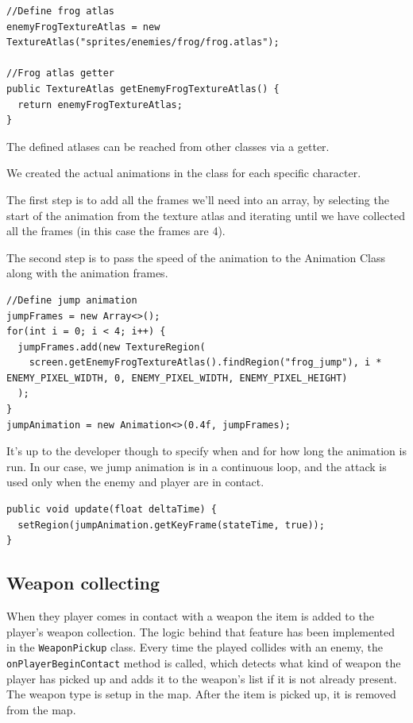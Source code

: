 \documentclass[12p]{article}
\begin{document}
\begin{verbatim}
//Define frog atlas
enemyFrogTextureAtlas = new TextureAtlas("sprites/enemies/frog/frog.atlas");

//Frog atlas getter
public TextureAtlas getEnemyFrogTextureAtlas() {
  return enemyFrogTextureAtlas;
}
\end{verbatim}

The defined atlases can be reached from other classes via a getter.

We created the actual animations in the class for each specific character. 

The first step is to add all the frames we'll need into an array, by selecting the start of the animation from the texture atlas and iterating until we have collected all the frames (in this case the frames are 4).

The second step is to pass the speed of the animation to the Animation Class along with the animation frames.

\begin{verbatim}
//Define jump animation
jumpFrames = new Array<>();
for(int i = 0; i < 4; i++) {
  jumpFrames.add(new TextureRegion(
    screen.getEnemyFrogTextureAtlas().findRegion("frog_jump"), i * ENEMY_PIXEL_WIDTH, 0, ENEMY_PIXEL_WIDTH, ENEMY_PIXEL_HEIGHT)
  );
}
jumpAnimation = new Animation<>(0.4f, jumpFrames);
\end{verbatim}

It's up to the developer though to specify when and for how long the animation is run. In our case, we jump animation is in a continuous loop, and the attack is used only when the enemy and player are in contact.

\begin{verbatim}
public void update(float deltaTime) {
  setRegion(jumpAnimation.getKeyFrame(stateTime, true));
}
\end{verbatim}


\subsection{Weapon collecting} \label{DocWeaponCollection}

When they player comes in contact with a weapon the item is added to the player's weapon collection. The logic behind that feature has been implemented in the \texttt{WeaponPickup} class. Every time the played collides with an enemy, the \texttt{onPlayerBeginContact} method is called, which detects what kind of weapon the player has picked up and adds it to the weapon's list if it is not already present. The weapon type is setup in the map. After the item is picked up, it is removed from the map.
\end{document}
